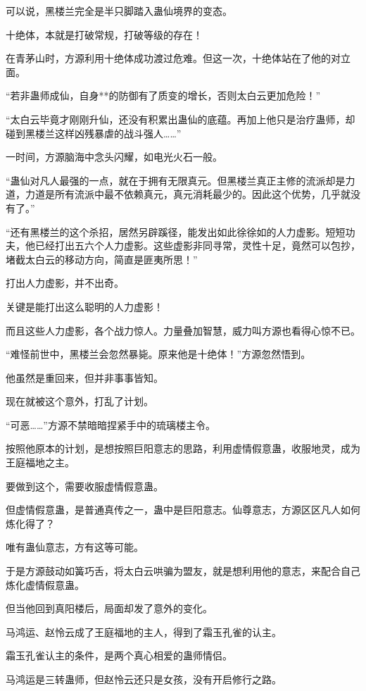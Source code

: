 \begin{this_body}
可以说，黑楼兰完全是半只脚踏入蛊仙境界的变态。

十绝体，本就是打破常规，打破等级的存在！

在青茅山时，方源利用十绝体成功渡过危难。但这一次，十绝体站在了他的对立面。

“若非蛊师成仙，自身**的防御有了质变的增长，否则太白云更加危险！”

“太白云毕竟才刚刚升仙，还没有积累出蛊仙的底蕴。再加上他只是治疗蛊师，却碰到黑楼兰这样凶残暴虐的战斗强人……”

一时间，方源脑海中念头闪耀，如电光火石一般。

“蛊仙对凡人最强的一点，就在于拥有无限真元。但黑楼兰真正主修的流派却是力道，力道是所有流派中最不依赖真元，真元消耗最少的。因此这个优势，几乎就没有了。”

“还有黑楼兰的这个杀招，居然另辟蹊径，能发出如此徐徐如的人力虚影。短短功夫，他已经打出五六个人力虚影。这些虚影非同寻常，灵性十足，竟然可以包抄，堵截太白云的移动方向，简直是匪夷所思！”

打出人力虚影，并不出奇。

关键是能打出这么聪明的人力虚影！

而且这些人力虚影，各个战力惊人。力量叠加智慧，威力叫方源也看得心惊不已。

“难怪前世中，黑楼兰会忽然暴毙。原来他是十绝体！”方源忽然悟到。

他虽然是重回来，但并非事事皆知。

现在就被这个意外，打乱了计划。

“可恶……”方源不禁暗暗捏紧手中的琉璃楼主令。

按照他原本的计划，是想按照巨阳意志的思路，利用虚情假意蛊，收服地灵，成为王庭福地之主。

要做到这个，需要收服虚情假意蛊。

但虚情假意蛊，是普通真传之一，蛊中是巨阳意志。仙尊意志，方源区区凡人如何炼化得了？

唯有蛊仙意志，方有这等可能。

于是方源鼓动如簧巧舌，将太白云哄骗为盟友，就是想利用他的意志，来配合自己炼化虚情假意蛊。

但当他回到真阳楼后，局面却发了意外的变化。

马鸿运、赵怜云成了王庭福地的主人，得到了霜玉孔雀的认主。

霜玉孔雀认主的条件，是两个真心相爱的蛊师情侣。

马鸿运是三转蛊师，但赵怜云还只是女孩，没有开启修行之路。


\end{this_body}

